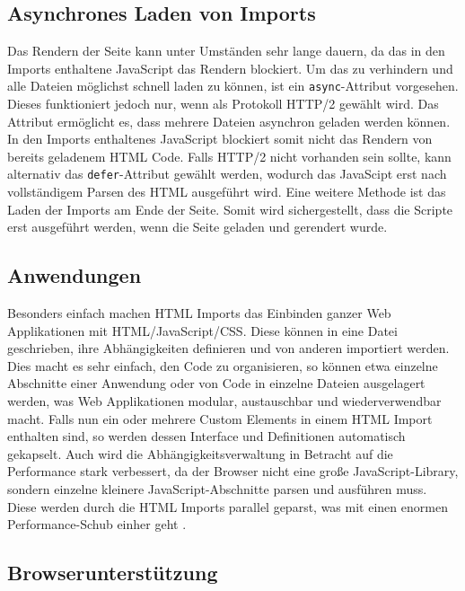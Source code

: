 \subsection{Asynchrones Laden von Imports}\label{asynchrones-laden-von-imports}

Das Rendern der Seite kann unter Umständen sehr lange dauern, da das in den Imports enthaltene JavaScript das Rendern blockiert. Um das zu verhindern und alle Dateien möglichst schnell laden zu können, ist ein \texttt{async}-Attribut vorgesehen. Dieses funktioniert jedoch nur, wenn als Protokoll \ac{HTTP}/2 gewählt wird. Das Attribut ermöglicht es, dass mehrere Dateien asynchron geladen werden können. In den Imports enthaltenes JavaScript blockiert somit nicht das Rendern von bereits geladenem \ac{HTML} Code. Falls \ac{HTTP}/2 nicht vorhanden sein sollte, kann alternativ das \texttt{defer}-Attribut gewählt werden, wodurch das JavaScipt erst nach vollständigem Parsen des \ac{HTML} ausgeführt wird. Eine weitere Methode ist das Laden der Imports am Ende der Seite. Somit wird sichergestellt, dass die Scripte erst ausgeführt werden, wenn die Seite geladen und gerendert wurde.


\subsection{Anwendungen}\label{anwendungen}

Besonders einfach machen \ac{HTML} Imports das Einbinden ganzer Web Applikationen mit \ac{HTML}/JavaScript/\ac{CSS}. Diese können in eine Datei geschrieben, ihre Abhängigkeiten definieren und von anderen importiert werden. Dies macht es sehr einfach, den Code zu organisieren, so können etwa einzelne Abschnitte einer Anwendung oder von Code in einzelne Dateien ausgelagert werden, was Web Applikationen modular, austauschbar und wiederverwendbar macht. Falls nun ein oder mehrere Custom Elements in einem \ac{HTML} Import enthalten sind, so werden dessen Interface und Definitionen automatisch gekapselt. Auch wird die Abhängigkeitsverwaltung in Betracht auf die Performance stark verbessert, da der Browser nicht eine große JavaScript-Library, sondern einzelne kleinere JavaScript-Abschnitte parsen und ausführen muss. Diese werden durch die \ac{HTML} Imports parallel geparst, was mit einen enormen Performance-Schub einher geht \cite{citeulike:13853647}.


\subsection{Browserunterstützung}\label{browserunterstuxfctzung}

